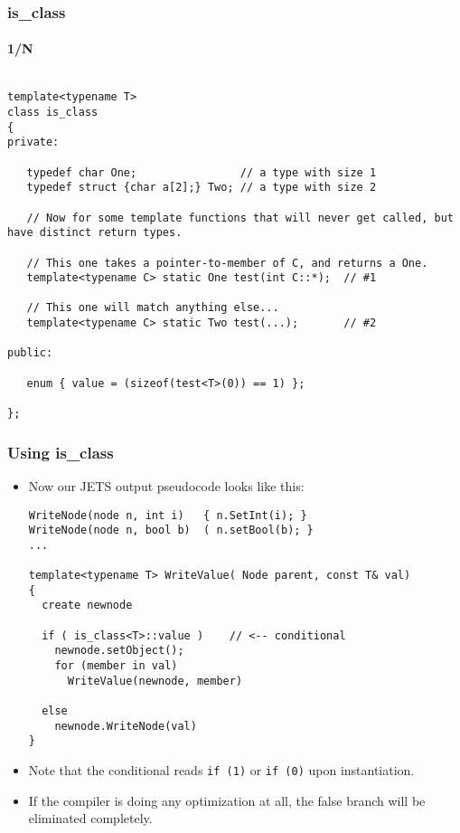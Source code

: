 \begin{frame}[fragile,t]
\frametitle{is\_class}
\framesubtitle{1/N}
{\scriptsize\begin{verbatim}

template<typename T>
class is_class
{
private:

   typedef char One;                // a type with size 1
   typedef struct {char a[2];} Two; // a type with size 2

   // Now for some template functions that will never get called, but have distinct return types.

   // This one takes a pointer-to-member of C, and returns a One.
   template<typename C> static One test(int C::*);  // #1

   // This one will match anything else...
   template<typename C> static Two test(...);       // #2

public:

   enum { value = (sizeof(test<T>(0)) == 1) };

};

\end{verbatim}
}

\end{frame}

\begin{frame}[fragile,t]
\frametitle{Using is\_class}
\begin{itemize}[<+->]
\item Now our JETS output pseudocode looks like this:
{\scriptsize\begin{verbatim}
WriteNode(node n, int i)   { n.SetInt(i); }
WriteNode(node n, bool b)  ( n.setBool(b); }
...

template<typename T> WriteValue( Node parent, const T& val)
{
  create newnode

  if ( is_class<T>::value )    // <-- conditional
    newnode.setObject();
    for (member in val)
      WriteValue(newnode, member)

  else 
    newnode.WriteNode(val)
}
\end{verbatim}
}
\item Note that the conditional reads \texttt{if (1)} or \texttt{if (0)} upon instantiation.
\item If the compiler is doing any optimization at all, the false
  branch will be eliminated completely.

\end{itemize}


\end{frame}

